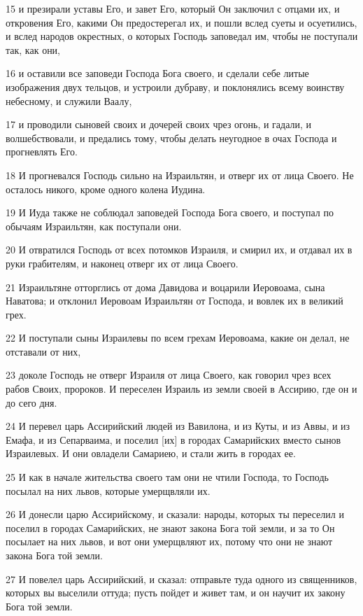 \par 15 и презирали уставы Его, и завет Его, который Он заключил с отцами их, и откровения Его, какими Он предостерегал их, и пошли вслед суеты и осуетились, и вслед народов окрестных, о которых Господь заповедал им, чтобы не поступали так, как они,
\par 16 и оставили все заповеди Господа Бога своего, и сделали себе литые изображения двух тельцов, и устроили дубраву, и поклонялись всему воинству небесному, и служили Ваалу,
\par 17 и проводили сыновей своих и дочерей своих чрез огонь, и гадали, и волшебствовали, и предались тому, чтобы делать неугодное в очах Господа и прогневлять Его.
\par 18 И прогневался Господь сильно на Израильтян, и отверг их от лица Своего. Не осталось никого, кроме одного колена Иудина.
\par 19 И Иуда также не соблюдал заповедей Господа Бога своего, и поступал по обычаям Израильтян, как поступали они.
\par 20 И отвратился Господь от всех потомков Израиля, и смирил их, и отдавал их в руки грабителям, и наконец отверг их от лица Своего.
\par 21 Израильтяне отторглись от дома Давидова и воцарили Иеровоама, сына Наватова; и отклонил Иеровоам Израильтян от Господа, и вовлек их в великий грех.
\par 22 И поступали сыны Израилевы по всем грехам Иеровоама, какие он делал, не отставали от них,
\par 23 доколе Господь не отверг Израиля от лица Своего, как говорил чрез всех рабов Своих, пророков. И переселен Израиль из земли своей в Ассирию, где он и до сего дня.
\par 24 И перевел царь Ассирийский людей из Вавилона, и из Куты, и из Аввы, и из Емафа, и из Сепарваима, и поселил [их] в городах Самарийских вместо сынов Израилевых. И они овладели Самариею, и стали жить в городах ее.
\par 25 И как в начале жительства своего там они не чтили Господа, то Господь посылал на них львов, которые умерщвляли их.
\par 26 И донесли царю Ассирийскому, и сказали: народы, которых ты переселил и поселил в городах Самарийских, не знают закона Бога той земли, и за то Он посылает на них львов, и вот они умерщвляют их, потому что они не знают закона Бога той земли.
\par 27 И повелел царь Ассирийский, и сказал: отправьте туда одного из священников, которых вы выселили оттуда; пусть пойдет и живет там, и он научит их закону Бога той земли.
